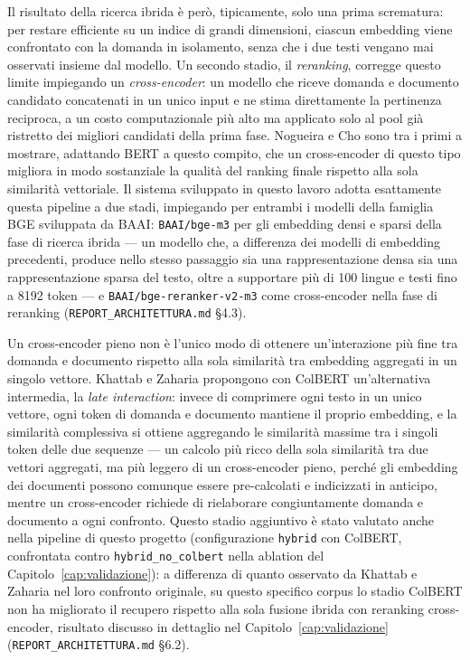 Il risultato della ricerca ibrida è però, tipicamente, solo una prima scrematura: per restare efficiente su un indice
di grandi dimensioni, ciascun embedding viene confrontato con la domanda in isolamento, senza che i due testi vengano
mai osservati insieme dal modello. Un secondo stadio, il \emph{reranking}, corregge questo limite impiegando un
\emph{cross-encoder}: un modello che riceve domanda e documento candidato concatenati in un unico input e ne stima
direttamente la pertinenza reciproca, a un costo computazionale più alto ma applicato solo al pool già ristretto dei
migliori candidati della prima fase. Nogueira e Cho \cite{nogueira2019bert} sono tra i primi a mostrare, adattando
BERT a questo compito, che un cross-encoder di questo tipo migliora in modo sostanziale la qualità del ranking finale
rispetto alla sola similarità vettoriale. Il sistema sviluppato in questo lavoro adotta esattamente questa pipeline a
due stadi, impiegando per entrambi i modelli della famiglia BGE sviluppata da BAAI: \texttt{BAAI/bge-m3}
\cite{chen2024bgem3} per gli embedding densi e sparsi della fase di ricerca ibrida --- un modello che, a differenza
dei modelli di embedding precedenti, produce nello stesso passaggio sia una rappresentazione densa sia una
rappresentazione sparsa del testo, oltre a supportare più di 100 lingue e testi fino a 8192 token --- e
\texttt{BAAI/bge-reranker-v2-m3} come cross-encoder nella fase di reranking (\texttt{REPORT\_ARCHITETTURA.md} \S4.3).

Un cross-encoder pieno non è l'unico modo di ottenere un'interazione più fine tra domanda e documento rispetto alla
sola similarità tra embedding aggregati in un singolo vettore. Khattab e Zaharia \cite{khattab2020colbert} propongono
con ColBERT un'alternativa intermedia, la \emph{late interaction}: invece di comprimere ogni testo in un unico
vettore, ogni token di domanda e documento mantiene il proprio embedding, e la similarità complessiva si ottiene
aggregando le similarità massime tra i singoli token delle due sequenze --- un calcolo più ricco della sola
similarità tra due vettori aggregati, ma più leggero di un cross-encoder pieno, perché gli embedding dei documenti
possono comunque essere pre-calcolati e indicizzati in anticipo, mentre un cross-encoder richiede di rielaborare
congiuntamente domanda e documento a ogni confronto. Questo stadio aggiuntivo è stato valutato anche nella pipeline
di questo progetto (configurazione \texttt{hybrid} con ColBERT, confrontata contro \texttt{hybrid\_no\_colbert} nella
ablation del Capitolo~\ref{cap:validazione}): a differenza di quanto osservato da Khattab e Zaharia nel loro
confronto originale, su questo specifico corpus lo stadio ColBERT non ha migliorato il recupero rispetto alla sola
fusione ibrida con reranking cross-encoder, risultato discusso in dettaglio nel Capitolo~\ref{cap:validazione}
(\texttt{REPORT\_ARCHITETTURA.md} \S6.2).

